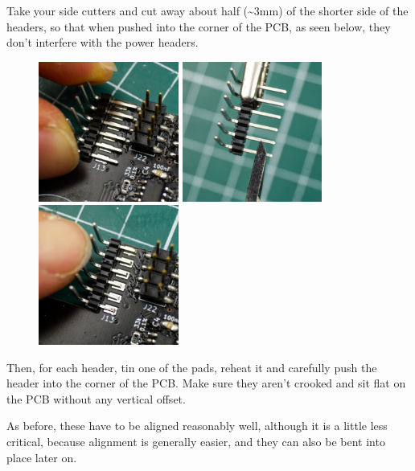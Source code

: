 \documentclass[12pt, a4paper]{article}
\begin{document}
Take your side cutters and cut away about half (\textasciitilde3mm) of the shorter side of the
headers, so that when pushed into the corner of the PCB, as seen below, they don't interfere
with the power headers.

\begin{figure}[H]
    \centering
    \includegraphics[width=46mm]{images/section_2-2_testfit.jpg}
    \hspace{2mm}
    \includegraphics[width=46mm]{images/section_2-2_cutting.jpg}
    \hspace{2mm}
    \includegraphics[width=46mm]{images/section_2-2_aligning.jpg}
\end{figure}

Then, for each header, tin one of the pads, reheat it and carefully push the header into the 
corner of the PCB. Make sure they aren't crooked and sit flat on the PCB without any vertical
offset.

As before, these have to be aligned reasonably well, although it is a little less critical,
because alignment is generally easier, and they can also be bent into place later on.
\end{document}
